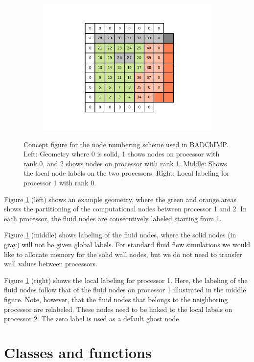 \documentclass[11pt,a4paper]{report}
\begin{document}
\begin{figure}[h]
\begin{subfigure}{0.32\textwidth}
	\includegraphics[width=1.2\textwidth]{./Figures/geo_plot03.png}
    \end{subfigure}
	\caption{Concept figure for the node numbering scheme used in BADChIMP. Left: Geometry where 0 is solid, 1 shows nodes on processor with rank 0, and 2 shows nodes on processor with rank 1. Middle: Shows the local node labels on the two processors. Right: Local labeling for processor 1 with rank 0.}\label{fig:geo_plot}
\end{figure}

Figure \ref{fig:geo_plot} (left) shows an example geometry, where the green and orange areas shows the partitioning of the computational nodes between processor 1 and 2. In each processor, the fluid nodes are consecutively labeled starting from 1. 

Figure \ref{fig:geo_plot} (middle) shows labeling of the fluid nodes, where the solid nodes (in gray) will not be given global labels.  
For standard fluid flow simulations we would like to allocate memory for the solid wall nodes, but we do not need to transfer wall values between processors. 

Figure \ref{fig:geo_plot} (right) shows the local labeling for processor 1. Here, the labeling of the fluid nodes follow that of the fluid nodes on processor 1 illustrated in the middle figure. Note, however, that the fluid nodes that belongs to the neighboring  processor are relabeled. These nodes need to be linked to the local labels on processor 2. The zero label is used as a default ghost node.

\chapter{Classes and functions}
\end{document}
